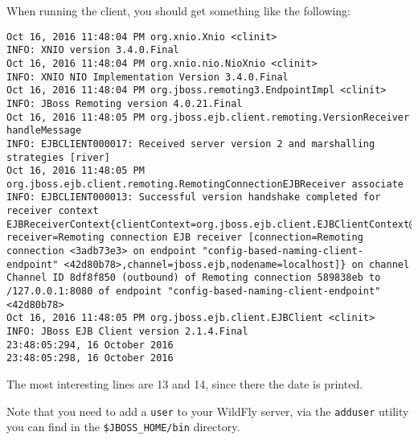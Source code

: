 \documentclass{report}
\begin{document}
When running the client, you should get something like the following:
\begin{lstlisting}[language=ksh]
Oct 16, 2016 11:48:04 PM org.xnio.Xnio <clinit>
INFO: XNIO version 3.4.0.Final
Oct 16, 2016 11:48:04 PM org.xnio.nio.NioXnio <clinit>
INFO: XNIO NIO Implementation Version 3.4.0.Final
Oct 16, 2016 11:48:04 PM org.jboss.remoting3.EndpointImpl <clinit>
INFO: JBoss Remoting version 4.0.21.Final
Oct 16, 2016 11:48:05 PM org.jboss.ejb.client.remoting.VersionReceiver handleMessage
INFO: EJBCLIENT000017: Received server version 2 and marshalling strategies [river]
Oct 16, 2016 11:48:05 PM org.jboss.ejb.client.remoting.RemotingConnectionEJBReceiver associate
INFO: EJBCLIENT000013: Successful version handshake completed for receiver context EJBReceiverContext{clientContext=org.jboss.ejb.client.EJBClientContext@1e88b3c, receiver=Remoting connection EJB receiver [connection=Remoting connection <3adb73e3> on endpoint "config-based-naming-client-endpoint" <42d80b78>,channel=jboss.ejb,nodename=localhost]} on channel Channel ID 8df8f850 (outbound) of Remoting connection 589838eb to /127.0.0.1:8080 of endpoint "config-based-naming-client-endpoint" <42d80b78>
Oct 16, 2016 11:48:05 PM org.jboss.ejb.client.EJBClient <clinit>
INFO: JBoss EJB Client version 2.1.4.Final
23:48:05:294, 16 October 2016
23:48:05:298, 16 October 2016
\end{lstlisting}
The most interesting lines are 13 and 14, since there the date is printed.

Note that you need to add a \texttt{user} to your WildFly server, via the \texttt{adduser} utility you can find in the \texttt{\$JBOSS\_HOME/bin} directory.
\end{document}
